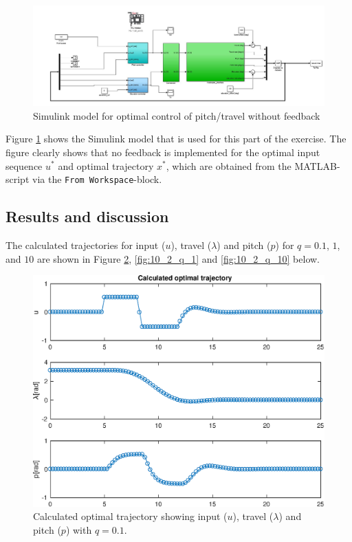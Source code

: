 \begin{figure}[H]
\captionsetup{justification=centering}
\includegraphics[width=1\linewidth]{figures/simuling_model_1024}
\centering
\caption{Simulink model for optimal control of pitch/travel without feedback}\label{fig:simulink_10_2} 
\end{figure}

Figure \ref{fig:simulink_10_2} shows the Simulink model that is used for this part of the exercise. The figure clearly shows that no feedback is implemented for the optimal input sequence $u^*$ and optimal trajectory $x^*$, which are obtained from the MATLAB-script via the \texttt{From Workspace}-block.

\subsection{Results and discussion}
The calculated trajectories for input ($u$), travel ($\lambda$) and pitch ($p$) for $q = 0.1$, $1$, and $10$ are shown in Figure \ref{fig:10_2_q_0.1}, \ref{fig:10_2_q_1} and \ref{fig:10_2_q_10} below.

\begin{figure}[H]
    \centering
    \captionsetup{justification=centering}
    \includegraphics[scale=0.5]{data_10.2/All_states_q_1000000e-01.eps}
    \caption{Calculated optimal trajectory showing input ($u$), travel ($\lambda$) and pitch ($p$) with $q = 0.1$.}
    \label{fig:10_2_q_0.1}
\end{figure}

